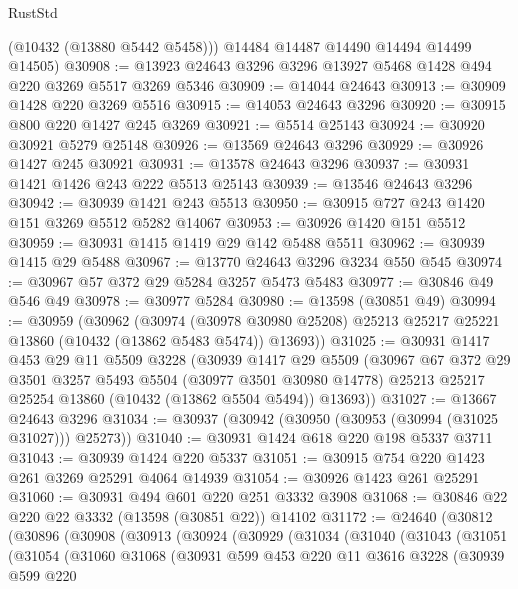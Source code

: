 \begin{lexlean}{RustStd}
\begin{coremodule}
        (@10432 (@13880 @5442 @5458)))
      @14484
      @14487
      @14490
      @14494
      @14499
      @14505)
@30908 := @13923 @24643 @3296 @3296 @13927 @5468 @1428 @494 @220 @3269 @5517 @3269 @5346
@30909 := @14044 @24643
@30913 := @30909 @1428 @220 @3269 @5516
@30915 := @14053 @24643 @3296
@30920 := @30915 @800 @220 @1427 @245 @3269
@30921 := @5514 @25143
@30924 := @30920 @30921 @5279 @25148
@30926 := @13569 @24643 @3296
@30929 := @30926 @1427 @245 @30921
@30931 := @13578 @24643 @3296
@30937 := @30931 @1421 @1426 @243 @222 @5513 @25143
@30939 := @13546 @24643 @3296
@30942 := @30939 @1421 @243 @5513
@30950 := @30915 @727 @243 @1420 @151 @3269 @5512 @5282 @14067
@30953 := @30926 @1420 @151 @5512
@30959 := @30931 @1415 @1419 @29 @142 @5488 @5511
@30962 := @30939 @1415 @29 @5488
@30967 := @13770 @24643 @3296 @3234 @550 @545
@30974 := @30967 @57 @372 @29 @5284 @3257 @5473 @5483
@30977 := @30846 @49 @546 @49
@30978 := @30977 @5284
@30980 := @13598 (@30851 @49)
@30994 := @30959
    (@30962
      (@30974
        (@30978 @30980 @25208)
        @25213
        @25217
        @25221
        @13860
        (@10432 (@13862 @5483 @5474))
        @13693))
@31025 := @30931
    @1417
    @453
    @29
    @11
    @5509
    @3228
    (@30939
      @1417
      @29
      @5509
      (@30967
        @67
        @372
        @29
        @3501
        @3257
        @5493
        @5504
        (@30977 @3501 @30980 @14778)
        @25213
        @25217
        @25254
        @13860
        (@10432 (@13862 @5504 @5494))
        @13693))
@31027 := @13667 @24643 @3296
@31034 := @30937 (@30942 (@30950 (@30953 (@30994 (@31025 @31027))) @25273))
@31040 := @30931 @1424 @618 @220 @198 @5337 @3711
@31043 := @30939 @1424 @220 @5337
@31051 := @30915 @754 @220 @1423 @261 @3269 @25291 @4064 @14939
@31054 := @30926 @1423 @261 @25291
@31060 := @30931 @494 @601 @220 @251 @3332 @3908
@31068 := @30846 @22 @220 @22 @3332 (@13598 (@30851 @22)) @14102
@31172 := @24640
    (@30812
      (@30896
        (@30908
          (@30913
            (@30924
              (@30929
                (@31034
                  (@31040
                    (@31043
                      (@31051
                        (@31054
                          (@31060
                            @31068
                            (@30931
                              @599
                              @453
                              @220
                              @11
                              @3616
                              @3228
                              (@30939
                                @599
                                @220

\end{coremodule}
\end{lexlean}
